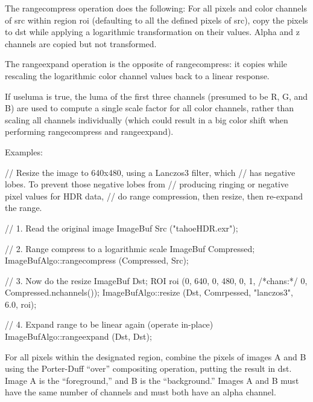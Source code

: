 The {\cf rangecompress} operation does the following: For all pixels and
color channels of {\cf src} within region {\cf roi} (defaulting to all
the defined pixels of {\cf src}), copy the pixels to {\cf dst}
while applying a logarithmic transformation on
their values.  Alpha and z channels are copied but not transformed.

The {\cf rangeexpand} operation is the opposite of {\cf rangecompress}: it
copies while rescaling the logarithmic color channel values back to a linear
response.

If {\cf useluma} is true, the luma of the first three channels (presumed
to be R, G, and B) are used to compute a single scale factor for all
color channels, rather than scaling all channels individually (which
could result in a big color shift when performing {\cf rangecompress}
and {\cf rangeexpand}).

\smallskip
\noindent Examples:
\begin{code}
    // Resize the image to 640x480, using a Lanczos3 filter, which
    // has negative lobes. To prevent those negative lobes from
    // producing ringing or negative pixel values for HDR data,
    // do range compression, then resize, then re-expand the range.

    // 1. Read the original image
    ImageBuf Src ("tahoeHDR.exr");

    // 2. Range compress to a logarithmic scale
    ImageBuf Compressed;
    ImageBufAlgo::rangecompress (Compressed, Src);

    // 3. Now do the resize
    ImageBuf Dst;
    ROI roi (0, 640, 0, 480, 0, 1, /*chans:*/ 0, Compressed.nchannels());
    ImageBufAlgo::resize (Dst, Comrpessed, "lanczos3", 6.0, roi);

    // 4. Expand range to be linear again (operate in-place)
    ImageBufAlgo::rangeexpand (Dst, Dst);
\end{code}
\apiend


 

For all pixels within the designated region, combine the pixels of
images {\cf A} and {\cf B} using the Porter-Duff ``over'' compositing
operation, putting the result in {\cf dst}.  Image {\cf A} is the
``foreground,'' and {\cf B} is the ``background.''  Images {\cf A} and
{\cf B} must have the same number of channels and must both have an
alpha channel.

